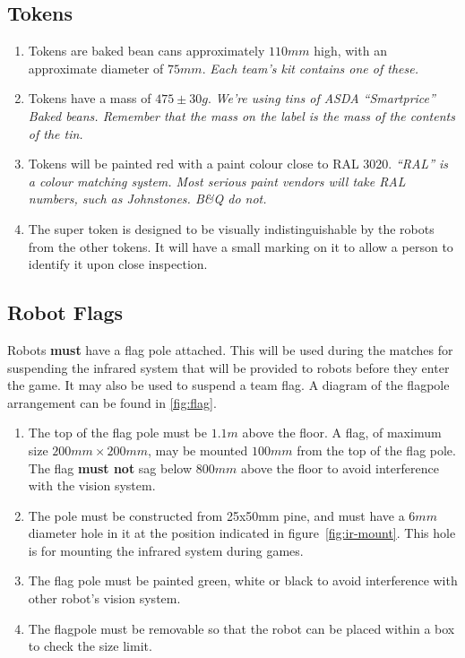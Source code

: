 \subsection{Tokens}
\label{sub:Tokens}
\begin {enumerate}
\item Tokens are baked bean cans approximately $110mm$ high, with an approximate diameter of $75mm$.
\emph{Each team's kit contains one of these.}
\item Tokens have a mass of $475\pm30g$.  \emph{We're using tins of ASDA ``Smartprice'' Baked beans.  Remember that the mass on the label is the mass of the contents of the tin.}
\item Tokens will be painted red with a paint colour close to RAL 3020.  \emph{``RAL'' is  a colour matching system.  Most serious paint vendors will take RAL numbers, such as Johnstones.  B\&Q do not.}

\item The super token is designed to be visually indistinguishable by the robots from the other tokens.  It will have a small marking on it to allow a person to identify it upon close inspection.
\end {enumerate}

\subsection{Robot Flags}
\label{sub:Flags}

Robots \textbf{must} have a flag pole attached.  This will be used during the matches for suspending the infrared system that will be provided to robots before they enter the game.  It may also be used to suspend a team flag.  A diagram of the flagpole arrangement can be found in \autoref{fig:flag}.

\begin{enumerate}
\item The top of the flag pole must be $1.1m$ above the floor.  A flag, of maximum size $200mm \times 200mm$, may be mounted $100mm$ from the top of the flag pole.  The flag \textbf{must not} sag below $800mm$ above the floor to avoid interference with the vision system.

\item The pole must be constructed from 25x50mm pine, and must have a $6mm$ diameter hole in it at the position indicated in figure~\ref{fig:ir-mount}.  This hole is for mounting the infrared system during games.

\item The flag pole must be painted green, white or black to avoid interference with other robot's vision system.

\item The flagpole must be removable so that the robot can be placed within a box to check the size limit.
\end{enumerate}

